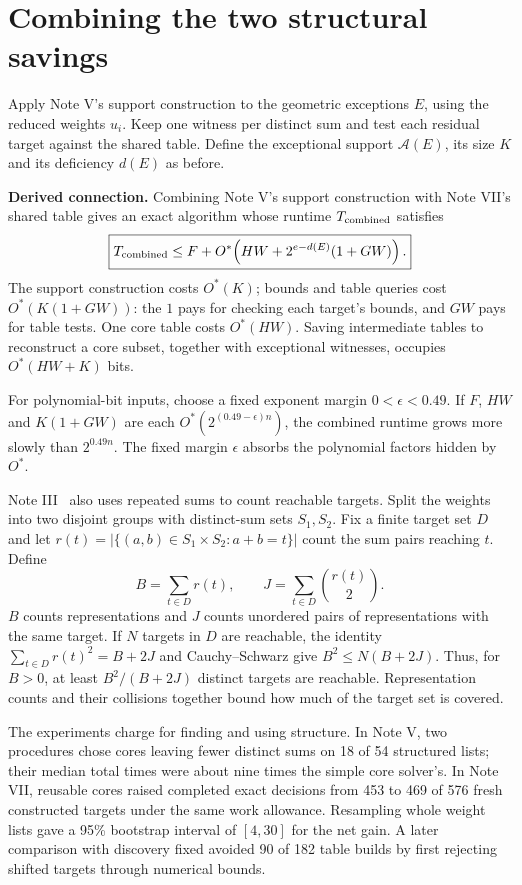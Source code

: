 \documentclass[11pt,english]{article}
\begin{document}
\newpage
\section{Combining the two structural savings}
Apply Note V's support construction to the geometric exceptions $E$, using
the reduced weights $u_i$. Keep one witness per distinct sum and test each
residual target against the shared table. Define the exceptional support
$\mathcal A(E)$, its size $K$ and its deficiency $d(E)$ as before.

\begin{tcolorbox}[accentbox]
\textbf{Derived connection.} Combining Note V's support construction with
Note VII's shared table gives an exact algorithm whose runtime $T_{\rm combined}$ satisfies
\[
 \boxed{T_{\rm combined}\le
 F+O^*\!\left(HW+2^{e-d(E)}(1+GW)\right).}
\]
The support construction costs $O^*(K)$; bounds and table queries cost
$O^*(K(1+GW))$: the $1$ pays for checking each target's bounds, and $GW$ pays
for table tests. One core table costs $O^*(HW)$. Saving intermediate tables
to reconstruct a core subset, together with exceptional witnesses, occupies
$O^*(HW+K)$ bits.
\end{tcolorbox}

For polynomial-bit inputs, choose a fixed exponent margin $0<\epsilon<0.49$.
If $F$, $HW$ and $K(1+GW)$ are each $O^*(2^{(0.49-\epsilon)n})$, the combined
runtime grows more slowly than $2^{0.49n}$. The fixed margin $\epsilon$ absorbs
the polynomial factors hidden by $O^*$.

Note III~\cite{iii} also uses repeated sums to count reachable targets. Split the
weights into two disjoint groups with distinct-sum sets $S_1,S_2$. Fix a finite
target set $D$ and let $r(t)=|\{(a,b)\in S_1\times S_2:a+b=t\}|$ count the
sum pairs reaching $t$. Define
\[
 B=\sum_{t\in D}r(t),\qquad J=\sum_{t\in D}\binom{r(t)}2.
\]
$B$ counts representations and $J$ counts unordered pairs of representations with the
same target. If $N$ targets in $D$ are reachable, the identity
$\sum_{t\in D}r(t)^2=B+2J$ and Cauchy--Schwarz give
$B^2\le N(B+2J)$. Thus, for $B>0$, at least $B^2/(B+2J)$ distinct targets
are reachable. Representation counts and their collisions together bound
how much of the target set is covered.

The experiments charge for finding and using structure. In Note V, two
procedures chose cores leaving fewer distinct sums on 18 of 54 structured
lists; their median total times were about nine times the simple core
solver's. In Note VII, reusable cores raised completed exact decisions from
453 to 469 of 576 fresh constructed targets under the same work allowance.
Resampling whole weight lists gave a 95\% bootstrap interval of $[4,30]$ for
the net gain. A later comparison with discovery fixed avoided 90 of 182
table builds by first rejecting shifted targets through numerical bounds.
\end{document}
